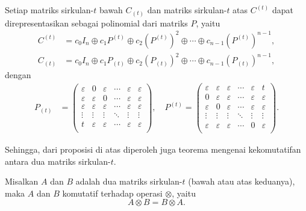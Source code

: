 \begin{proposisi}
  Setiap matriks sirkulan-$t$ bawah $C_{(t)}$ dan matriks sirkulan-$t$ atas $C^{(t)}$ dapat direpresentasikan sebagai polinomial dari matriks $P$, yaitu
  \begin{align*}
    C^{(t)} & = c_0 I_n \oplus c_1 P^{(t)} \oplus c_2 \left(P^{(t)}\right)^{2} \oplus \cdots \oplus c_{n-1} \left(P^{(t)}\right)^{n-1}, \\
    C_{(t)} & = c_0 I_n \oplus c_1 P_{(t)} \oplus c_2 \left(P_{(t)}\right)^{2} \oplus \cdots \oplus c_{n-1} \left(P_{(t)}\right)^{n-1},
  \end{align*}
  dengan
  \begin{align*}
    P_{(t)} & =
    \begin{pmatrix}
      \varepsilon & 0           & \varepsilon & \cdots & \varepsilon & \varepsilon \\
      \varepsilon & \varepsilon & 0           & \cdots & \varepsilon & \varepsilon \\
      \varepsilon & \varepsilon & \varepsilon & \cdots & \varepsilon & \varepsilon \\
      \vdots      & \vdots      & \vdots      & \ddots & \vdots      & \vdots      \\
      t           & \varepsilon & \varepsilon & \cdots & \varepsilon & \varepsilon \\
    \end{pmatrix}, \quad
    P^{(t)}  =
    \begin{pmatrix}
      \varepsilon & \varepsilon & \varepsilon & \cdots & \varepsilon & t           \\
      0           & \varepsilon & \varepsilon & \cdots & \varepsilon & \varepsilon \\
      \varepsilon & 0           & \varepsilon & \cdots & \varepsilon & \varepsilon \\
      \vdots      & \vdots      & \vdots      & \ddots & \vdots      & \vdots      \\
      \varepsilon & \varepsilon & \varepsilon & \cdots & 0           & \varepsilon \\
    \end{pmatrix}.
  \end{align*}
\end{proposisi}
Sehingga, dari proposisi di atas diperoleh juga teorema mengenai kekomutatifan antara dua matriks sirkulan-$t$.
\begin{teorema}
  Misalkan $A$ dan $B$ adalah dua matriks sirkulan-$t$ (bawah atau atas keduanya), maka $A$ dan $B$ komutatif terhadap operasi $\otimes$, yaitu
  \[
    A \otimes B = B \otimes A.
  \]
\end{teorema}

